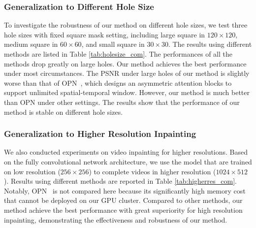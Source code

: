 \subsubsection{Generalization to Different Hole Size}
{\color{blue}	To investigate the robustness of our method on different hole sizes, we test three hole sizes with fixed square mask setting, including large square in $120\times120$, medium square in $60\times60$, and small square in $30\times30$. The results using different methods are listed in Table \ref{tab:holesize_com}. 
The performances of all the methods drop greatly on large holes. Our method achieves the best performance under most circumstances.
The PSNR under large holes of our method is slightly worse than that of OPN~\cite{oh2019onion}, which designs an asymmetric attention blocks to support unlimited spatial-temporal window. However, our method is much better than OPN under other settings. The results show that the performance of our method is stable on different hole sizes.

\subsubsection{Generalization to Higher Resolution Inpainting}
We also conducted experiments on video inpainting for higher resolutions. Based on the fully convolutional network architecture, we use the model that are trained on low resolution ($256\times256$) to complete videos in higher resolution ($1024\times512$). Results using different methods are reported in Table \ref{tab:higherres_com}. Notably, OPN~\cite{oh2019onion} is not compared here because its significantly high memory cost that cannot be deployed on our GPU cluster. 
Compared to other methods, our method achieve the best performance with great superiority for high resolution inpainting, demonstrating the effectiveness and robustness of our method.
}
 

